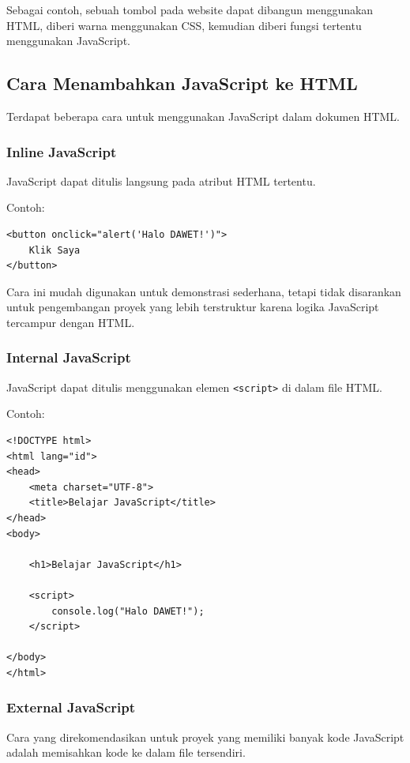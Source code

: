 \documentclass[12pt,a4paper]{article}
\begin{document}
Sebagai contoh, sebuah tombol pada website dapat
dibangun menggunakan HTML, diberi warna menggunakan
CSS, kemudian diberi fungsi tertentu menggunakan
JavaScript.

\subsection{Cara Menambahkan JavaScript ke HTML}

Terdapat beberapa cara untuk menggunakan JavaScript
dalam dokumen HTML.

\subsubsection{Inline JavaScript}

JavaScript dapat ditulis langsung pada atribut HTML
tertentu.

Contoh:

\begin{lstlisting}
<button onclick="alert('Halo DAWET!')">
    Klik Saya
</button>
\end{lstlisting}

Cara ini mudah digunakan untuk demonstrasi sederhana,
tetapi tidak disarankan untuk pengembangan proyek
yang lebih terstruktur karena logika JavaScript
tercampur dengan HTML.

\subsubsection{Internal JavaScript}

JavaScript dapat ditulis menggunakan elemen
\texttt{<script>} di dalam file HTML.

Contoh:

\begin{lstlisting}
<!DOCTYPE html>
<html lang="id">
<head>
    <meta charset="UTF-8">
    <title>Belajar JavaScript</title>
</head>
<body>

    <h1>Belajar JavaScript</h1>

    <script>
        console.log("Halo DAWET!");
    </script>

</body>
</html>
\end{lstlisting}

\subsubsection{External JavaScript}

Cara yang direkomendasikan untuk proyek yang
memiliki banyak kode JavaScript adalah memisahkan
kode ke dalam file tersendiri.
\end{document}
